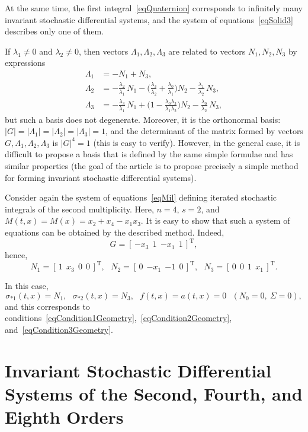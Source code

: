 \documentclass[10pt,reqno]{amsart}
\newcommand{\trans}{{\scriptscriptstyle \mathrm{T}}}
\theoremstyle{plain}
\theoremstyle{remark}
\begin{document}
At the same time, the first integral~\eqref{eqQuaternion} corresponds to infinitely many invariant stochastic differential systems, and the system of equations~\eqref{eqSolid3} describes only one of them.

If $\lambda_1 \neq 0$ and $\lambda_2 \neq 0$, then vectors $\Lambda_1,\Lambda_2,\Lambda_3$ are related to vectors $N_1,N_2,N_3$ by expressions
\begin{align*}
  \Lambda_1 & = -N_1 + N_3, \\
  \Lambda_2 & = -\frac{\lambda_2}{\lambda_1} \, N_1 - \biggl( \frac{\lambda_3}{\lambda_2} + \frac{\lambda_0}{\lambda_1} \biggr) N_2 - \frac{\lambda_1}{\lambda_2} \, N_3, \\
  \Lambda_3 & = -\frac{\lambda_3}{\lambda_1} \, N_1 + \biggl( 1 - \frac{\lambda_0 \lambda_3}{\lambda_1 \lambda_2} \biggr) N_2 - \frac{\lambda_0}{\lambda_2} \, N_3,
\end{align*}
but such a basis does not degenerate. Moreover, it is the orthonormal basis: $|G| = |\Lambda_1| = |\Lambda_2| = |\Lambda_3| = 1$, and the determinant of the matrix formed by vectors $G,\Lambda_1,\Lambda_2,\Lambda_3$ is $|G|^4 = 1$ (this is easy to verify). However, in the general case, it is difficult to propose a basis that is defined by the same simple formulae and has similar properties (the goal of the article is to propose precisely a simple method for forming invariant stochastic differential systems).

Consider again the system of equations~\eqref{eqMil} defining iterated stochastic integrals of the second multiplicity. Here, $n = 4$, $s = 2$, and $M(t,x) = M(x) = x_2 + x_4 - x_1 x_3$. It is easy to show that such a system of equations can be obtained by the described method. Indeed,
\[
  G = [ \, {-x_3} \ \ 1 \ \ {-x_1} \ \ 1 \, ]^\trans,
\]
hence,
\[
  N_1 = [ \, 1 \ \ x_3 \ \ 0 \ \ 0 \, ]^\trans, \ \ \
  N_2 = [ \, 0 \ \ {-x_1} \ \ {-1} \ \ 0 \, ]^\trans, \ \ \
  N_3 = [ \, 0 \ \ 0 \ \ 1 \ \ x_1 \, ]^\trans.
\]

In this case,
\[
  \sigma_{*1}(t,x) = N_1, \ \ \ \sigma_{*2}(t,x) = N_3, \ \ \ f(t,x) = a(t,x) = 0 \ \ \ (N_0 = 0, ~ \Sigma = 0),
\]
and this corresponds to conditions~\eqref{eqCondition1Geometry},~\eqref{eqCondition2Geometry}, and~\eqref{eqCondition3Geometry}.



\section{Invariant Stochastic Differential Systems of the Second, Fourth, and Eighth Orders}\label{secDim248}
\end{document}
